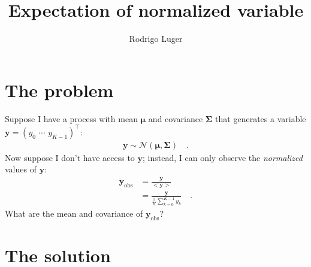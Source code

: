 \documentclass[modern]{aastex62}
\begin{document}
\title{%
    \textbf{
        Expectation of normalized variable
    }
}

\author{Rodrigo Luger}

\section{The problem}

Suppose I have a process with mean $\pmb{\mu}$ and covariance
$\pmb{\Sigma}$ that generates a variable
$\mathbf{y} = \left( y_0 \,\, \cdots \,\, y_{K-1} \right)^\top$:
%
\begin{align}
    \mathbf{y} \sim \mathcal{N}\left( \pmb{\mu}, \pmb{\Sigma} \right)
    \quad.
\end{align}
%
Now suppose
I don't have access to $\mathbf{y}$; instead, I can only observe the \emph{normalized}
values of $\mathbf{y}$:
%
\begin{align}
    \mathbf{y}_{\mathrm{obs}}
     & = \frac{\mathbf{y}}{\big<\mathbf{y}\big>}
    \nonumber                                                      \\[0.5em]
     & = \frac{\mathbf{y}}{\frac{1}{K}\sum\limits_{k=0}^{K-1} y_k}
    \quad.
\end{align}
%
What are the mean and covariance of $\mathbf{y}_{\mathrm{obs}}$?

\section{The solution}
\end{document}
